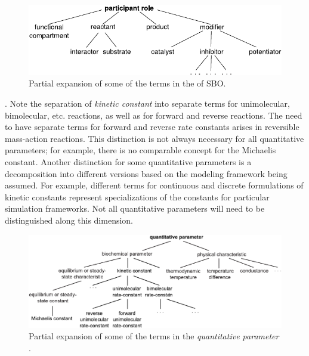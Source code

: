 \begin{figure}[htb]
  \vspace*{1ex}
  \centering
  \includegraphics[scale = 0.8]{figs/sbo-participant-role}
  \caption{Partial expansion of some of the terms in the
     of SBO.}
  \label{fig:expanded-speciesRef}
\end{figure}

.  Note the separation of
\emph{kinetic constant} into separate terms for unimolecular,
bimolecular, etc. reactions, as well as for forward and
reverse reactions.  The need to have separate terms for forward
and reverse rate constants arises in reversible mass-action
reactions.  This distinction is not always necessary for all
quantitative parameters; for example, there is no comparable
concept for the Michaelis constant.  Another distinction for some
quantitative parameters is a decomposition into different versions
based on the modeling framework being assumed.  For example,
different terms for continuous and discrete formulations of
kinetic constants represent specializations of the constants for
particular simulation frameworks.  Not all quantitative parameters
will need to be distinguished along this dimension.

\begin{figure}[tbh]
  \vspace*{1ex}
  \centering
  \includegraphics[scale = 0.8]{figs/sbo-quantitative-parameter}
  \caption{Partial expansion of some of the terms in the \emph{quantitative
      parameter} .}
  \label{fig:expanded-parameter}
\end{figure}

